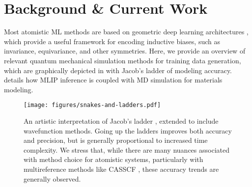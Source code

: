 \section{Background \& Current Work} \label{sec:background}

Most atomistic ML methods are based on geometric deep learning architectures \citep{duval2023hitchhiker}, which provide a useful framework for encoding inductive biases, such as invariance, equivariance, and other symmetries. Here, we provide an overview of relevant quantum mechanical simulation methods for training data generation, which are graphically depicted in  with Jacob's ladder of modeling accuracy.  details how MLIP inference is coupled with MD simulation for materials modeling.

\begin{figure}[h]
    \vspace{-0.2cm}
    \centering
    \texttt{[image: figures/snakes-and-ladders.pdf]}
    \vspace{-0.65cm}
    \caption{An artistic interpretation of Jacob's ladder \citep{perdew2005prescription}, extended to include wavefunction methods. Going up the ladders improves both accuracy and precision, but is generally proportional to increased time complexity. We stress that, while there are many nuances associated with method choice for atomistic systems, particularly with multireference methods like CASSCF \citep{roos1980complete}, these accuracy trends are generally observed.}
    \label{fig:jacobsladder}
    \vspace{-0.2cm}
\end{figure}


